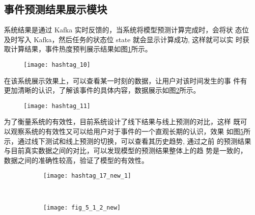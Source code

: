 \subsection{事件预测结果展示模块}

系统结果是通过 Kafka 实时反馈的，当系统将模型预测计算完成时，会将状 态位及时写入 Kafka，然后任务的状态位 state 就会显示计算成功, 这样就可以实 时获取计算结果，事件热度预判展示结果如图\ref{fig:5_6}所示。

\begin{figure}[H]
    \centering
    \texttt{[image: hashtag\_10]}
    \label{fig:5_6}
\end{figure}

在该系统展示效果上，可以查看某一时刻的数据，让用户对该时间发生的事 件有更加清晰的认识，了解该事件的具体内容，数据展示如图\ref{fig:5_7}所示。

\begin{figure}[H]
    \centering
    \texttt{[image: hashtag\_11]}
    \label{fig:5_7}
\end{figure}


为了衡量系统的有效性，目前系统设计了线下结果与线上预测的对比，这样 既可以观察系统的有效性又可以给用户对于事件的一个直观长期的认识，效果 如图\ref{fig:5_11}所示，通过线下测试和线上预测的切换，可以查看其历史趋势, 通过之前 的预测结果与目前真实数据之间的对比，可以发现模型的预测结果整体上的趋 势是一致的，数据之间的准确性较高，验证了模型的有效性。


\begin{figure}[H]
    \centering
   
    \begin{subfigure}[b]{0.5\textwidth}
      \texttt{[image: hashtag\_17\_new\_1]}
      \caption{}
      \label{fig:oaspl_a}
    \end{subfigure}%
    ~%
    \begin{subfigure}[b]{0.5\textwidth}
      \texttt{[image: fig\_5\_1\_2\_new]}
      \caption{}
      \label{fig:5_1}
    \end{subfigure}
    ~%
    \label{fig:5_11}
\end{figure}

